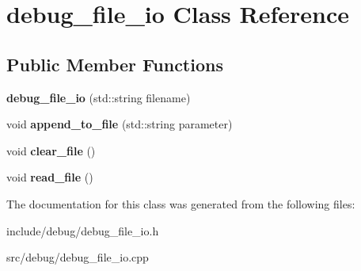 \hypertarget{classdebug__file__io}{\section{debug\-\_\-file\-\_\-io Class Reference}
\label{classdebug__file__io}
}
\subsection*{Public Member Functions}
\begin{DoxyCompactItemize}
\item 
\hypertarget{classdebug__file__io_a88d48202a891570de5168a3417c14107}{{\bfseries debug\-\_\-file\-\_\-io} (std\-::string filename)}\label{classdebug__file__io_a88d48202a891570de5168a3417c14107}

\item 
\hypertarget{classdebug__file__io_aa4bbe795ab157aca93b1238befdb68a5}{void {\bfseries append\-\_\-to\-\_\-file} (std\-::string parameter)}\label{classdebug__file__io_aa4bbe795ab157aca93b1238befdb68a5}

\item 
\hypertarget{classdebug__file__io_aa74a55bdc07bcac7a66a09a4ba300022}{void {\bfseries clear\-\_\-file} ()}\label{classdebug__file__io_aa74a55bdc07bcac7a66a09a4ba300022}

\item 
\hypertarget{classdebug__file__io_aa572275287fbdd56abd9e766c3abe67c}{void {\bfseries read\-\_\-file} ()}\label{classdebug__file__io_aa572275287fbdd56abd9e766c3abe67c}

\end{DoxyCompactItemize}


The documentation for this class was generated from the following files\-:\begin{DoxyCompactItemize}
\item 
include/debug/debug\-\_\-file\-\_\-io.\-h\item 
src/debug/debug\-\_\-file\-\_\-io.\-cpp\end{DoxyCompactItemize}
